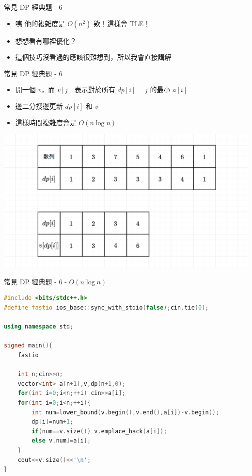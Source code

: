 \documentclass[aspectratio=169]{beamer}
\begin{document}
    \begin{frame}{常見 DP 經典題 - 6}
        \begin{itemize}
            \item 咦 他的複雜度是 $O(n^2)$ 欸！這樣會 TLE！
            \item<2-> 想想看有哪裡優化？
            \item<3-> 這個技巧沒看過的應該很難想到，所以我會直接講解
        \end{itemize}
    \end{frame}

    \begin{frame}{常見 DP 經典題 - 6}
        \begin{itemize}
            \item 開一個 $v$，而 $v[j]$ 表示對於所有 $dp[i] = j$ 的最小 $a[i]$
            \item 邊二分搜邊更新 $dp[i]$ 和 $v$ 
            \item<2-> 這樣時間複雜度會是 $O(n\log n)$
        \end{itemize}
        \begin{center}
            \includegraphics[scale=0.3]{images/LIS_Table.png}
        \end{center}
    \end{frame}
    
    \begin{frame}[fragile]{常見 DP 經典題 - 6 - $O(n \log n)$ }
        \begin{lstlisting}[language=C++, basicstyle=\ttfamily\tiny]
#include <bits/stdc++.h>
#define fastio ios_base::sync_with_stdio(false);cin.tie(0);

using namespace std;
 
signed main(){
    fastio
 
    int n;cin>>n;
    vector<int> a(n+1),v,dp(n+1,0);
    for(int i=0;i<n;++i) cin>>a[i];
    for(int i=0;i<n;++i){
        int num=lower_bound(v.begin(),v.end(),a[i])-v.begin();
        dp[i]=num+1;
        if(num==v.size()) v.emplace_back(a[i]);
        else v[num]=a[i];
    }
    cout<<v.size()<<'\n';
}
        \end{lstlisting}
    \end{frame}
\end{document}
